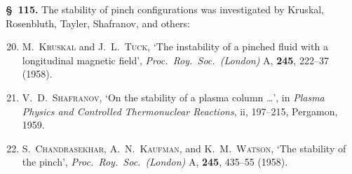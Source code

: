 \medskip\noindent
\textbf{\S~115.}  The stability of pinch configurations was
investigated by Kruskal, Rosenbluth, Tayler, Shafranov, and others:
\begin{enumerate}
\setcounter{enumi}{19}
\item M.~\textsc{Kruskal} and J.~L.~\textsc{Tuck}, `The instability
  of a pinched fluid with a longitudinal magnetic field',
  \emph{Proc.\ Roy.\ Soc.\ (London)} A, \textbf{245}, 222--37
  (1958).
\item V.~D.~\textsc{Shafranov}, `On the stability of a plasma column
  \ldots', in \emph{Plasma Physics and Controlled Thermonuclear
  Reactions}, ii, 197--215, Pergamon, 1959.
\item S.~\textsc{Chandrasekhar}, A.~N.~\textsc{Kaufman}, and
  K.~M.~\textsc{Watson}, `The stability of the pinch',
  \emph{Proc.\ Roy.\ Soc.\ (London)} A, \textbf{245}, 435--55
  (1958).
\end{enumerate}

